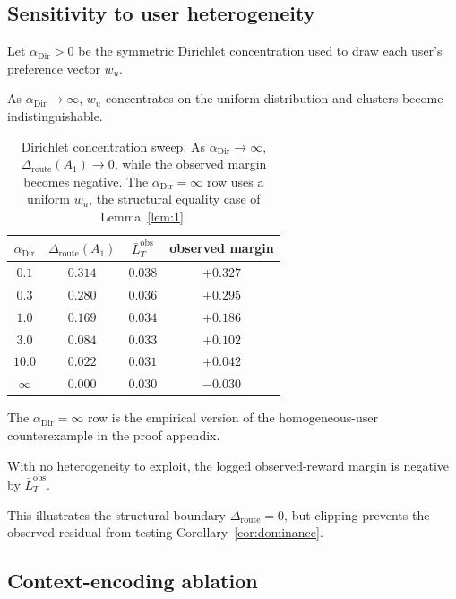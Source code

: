 \documentclass{article} %
\begin{document}
\subsection{Sensitivity to user heterogeneity}

\label{app:dirichlet-sweep}

Let \(\alpha_{\mathrm{Dir}}>0\) be the symmetric Dirichlet concentration used
to draw each user's preference vector \(w_u\).

As \(\alpha_{\mathrm{Dir}}\to\infty\), \(w_u\) concentrates on the uniform
distribution and clusters become indistinguishable.

\begin{table}[h]
\centering
\small
\begin{tabular}{cccc}
\toprule
\(\alpha_{\mathrm{Dir}}\) & $\Delta_{\mathrm{route}}(A_1)$ & $\bar L_T^{\mathrm{obs}}$ & observed margin \\
\midrule
$0.1$  & $0.314$ & $0.038$ & $+0.327$ \\
$0.3$  & $0.280$ & $0.036$ & $+0.295$ \\
$1.0$  & $0.169$ & $0.034$ & $+0.186$ \\
$3.0$  & $0.084$ & $0.033$ & $+0.102$ \\
$10.0$ & $0.022$ & $0.031$ & $+0.042$ \\
$\infty$ & $0.000$ & $0.030$ & $-0.030$ \\
\bottomrule
\end{tabular}
\caption{Dirichlet concentration sweep. As
\(\alpha_{\mathrm{Dir}}\to\infty\),
\(\Delta_{\mathrm{route}}(A_1)\to0\), while the observed margin becomes
negative. The \(\alpha_{\mathrm{Dir}}=\infty\) row uses a uniform \(w_u\), the structural
equality case of Lemma~\ref{lem:1}.}
\label{tab:app-dirichlet}
\end{table}

The \(\alpha_{\mathrm{Dir}}=\infty\) row is the empirical version of the
homogeneous-user counterexample in the proof appendix.

With no heterogeneity to exploit, the logged observed-reward margin is negative
by \(\bar L_T^{\mathrm{obs}}\).

This illustrates the structural boundary \(\Delta_{\mathrm{route}}=0\), but
clipping prevents the observed residual from testing
Corollary~\ref{cor:dominance}.

\subsection{Context-encoding ablation}
\end{document}
